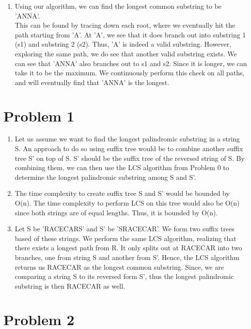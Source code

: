 \documentclass[12pt,letterpaper]{article}
\begin{document}
\begin{enumerate}
  \item 
    Using our algorithm, we can find the longest common substring to be 'ANNA'. \\
    This can be found by tracing down each root, where we eventually hit the path starting from 'A'.
    At 'A', we see that it does branch out into substring 1 (s1) and substring 2 (s2). 
    Thus, 'A' is indeed a valid substring.
    However, exploring the same path, we do see that another valid substring exists.
    We can see that 'ANNA' also branches out to s1 and s2. 
    Since it is longer, we can take it to be the maximum.
    We continuously perform this check on all paths, and will eventually find that 'ANNA' is the longest.
\end{enumerate}

\section*{Problem 1}

\begin{enumerate}
  \item
    Let us assume we want to find the longest palindromic substring in a string S.
    An approach to do so using suffix tree would be to combine another suffix tree S' on top of S.
    S' should be the suffix tree of the reversed string of S.
    By combining them, we can then use the LCS algorithm from Problem 0 to determine the longest palindromic substring among S and S'.
  \item 
    The time complexity to create suffix tree S and S' would be bounded by O(n).
    The time complexity to perform LCS on this tree would also be O(n) since both strings are of equal lengths.
    Thus, it is bounded by O(n).
  \item 
    Let S be 'RACECARS' and S' be 'SRACECAR'. 
    We form two suffix trees based of these strings.
    We perform the same LCS algorithm, realizing that there exists a longest path from R.
    It only splits out at RACECAR into two branches, one from string S and another from S'.
    Hence, the LCS algorithm returns us RACECAR as the longest common substring.
    Since, we are comparing a string S to its reversed form S', thus the longest palindromic substring is then RACECAR as well.
\end{enumerate}

\section*{Problem 2}
\end{document}
